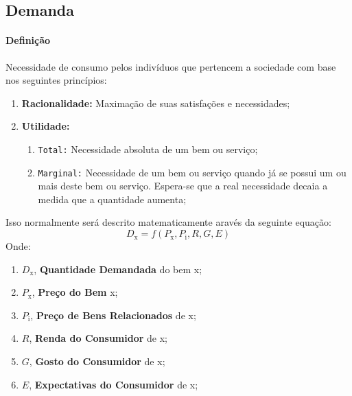 \documentclass{article}
\begin{document}
        \subsection{Demanda}
            \paragraph{Definição}Necessidade de consumo pelos indivíduos que pertencem a sociedade com base nos seguintes princípios:
                \begin{enumerate}[rightmargin = \leftmargin]
                    \item \textbf{Racionalidade:} Maximação de suas satisfações e necessidades;
                    \item \textbf{Utilidade:}
                        \begin{enumerate}[noitemsep, rightmargin = \leftmargin]
                            \item \texttt{Total:} Necessidade absoluta de um bem ou serviço;
                            \item \texttt{Marginal:} Necessidade de um bem ou serviço quando já se possui um ou mais deste bem ou serviço. Espera-se que a real necessidade decaia a medida que a quantidade aumenta;
                        \end{enumerate}
                \end{enumerate}
            Isso normalmente será descrito matematicamente aravés da seguinte equação:
                \begin{equation}
                    \boxed{
                        D_{\text{x}} =
                        f(
                            P_{\text{x}},
                            P_{\text{i}},
                            R,
                            G,
                            E
                        )
                    }
                \end{equation}
            Onde:
                \begin{enumerate}[noitemsep]
                    \item $D_{\text{x}}$, \textbf{Quantidade Demandada} do bem x;
                    \item $P_{\text{x}}$, \textbf{Preço do Bem} x;
                    \item $P_{\text{i}}$, \textbf{Preço de Bens Relacionados} de x;
                    \item $R$, \textbf{Renda do Consumidor} de x;
                    \item $G$, \textbf{Gosto do Consumidor} de x;
                    \item $E$, \textbf{Expectativas do Consumidor} de x;
                \end{enumerate}
\end{document}
